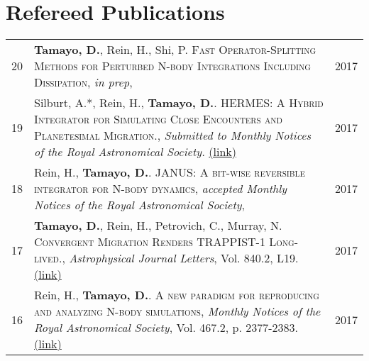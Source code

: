 \documentclass[10pt]{article} %
\begin{document}
{%



\section{Refereed Publications}

\begin{tabular}{>{\hfill}r|p{14.3cm}l}
20 & {\bf Tamayo, D.}, Rein, H., Shi, P. \textsc{Fast Operator-Splitting Methods for Perturbed N-body Integrations Including Dissipation}, {\it in prep}, & 2017 \\

19 & Silburt, A.*, Rein, H., {\bf Tamayo, D.}. \textsc{HERMES: A Hybrid Integrator for Simulating Close Encounters and Planetesimal Migration.}, {\it Submitted to Monthly Notices of the Royal Astronomical Society.} \href{http://cita.utoronto.ca/~dtamayo/hermes.pdf}{(link)} & 2017 \\

18 & Rein, H., {\bf Tamayo, D.}. \textsc{JANUS: A bit-wise reversible integrator for N-body dynamics}, {\it accepted Monthly Notices of the Royal Astronomical Society}, & 2017 \\

17 & {\bf Tamayo, D.}, Rein, H., Petrovich, C., Murray, N. \textsc{Convergent Migration Renders TRAPPIST-1 Long-lived.}, {\it Astrophysical Journal Letters}, Vol. 840.2, L19. \href{https://arxiv.org/abs/1704.02957}{(link)} & 2017 \\

16 & Rein, H., {\bf Tamayo, D.}. \textsc{A new paradigm for reproducing and analyzing N-body simulations}, {\it Monthly Notices of the Royal Astronomical Society}, Vol. 467.2, p. 2377-2383. \href{https://arxiv.org/abs/1701.07423}{(link)} & 2017 \\


\end{tabular}}
\end{document}
